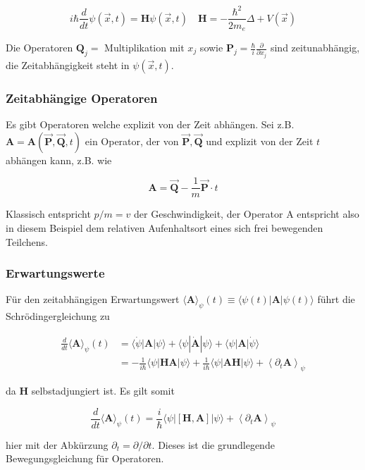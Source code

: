 \documentclass[10pt, letterpaper]{article}
\begin{document}
$$
i \hbar \frac{d}{d t} \psi(\vec{x}, t)=\mathbf{H} \psi(\vec{x}, t) \quad \mathbf{H}=-\frac{\hbar^{2}}{2 m_{e}} \Delta+V(\vec{x})
$$

Die Operatoren $\mathbf{Q}_{j}=$ Multiplikation mit $x_{j}$ sowie $\mathbf{P}_{j}=\frac{\hbar}{i} \frac{\partial}{\partial x_{j}}$ sind zeitunabhängig, die Zeitabhängigkeit steht in $\psi(\vec{x}, t)$.

\subsubsection*{Zeitabhängige Operatoren}
Es gibt Operatoren welche explizit von der Zeit abhängen. Sei z.B. $\mathbf{A}=\mathbf{A}(\overrightarrow{\mathbf{P}}, \overrightarrow{\mathbf{Q}}, t)$ ein Operator, der von $\overrightarrow{\mathbf{P}}, \overrightarrow{\mathbf{Q}}$ und explizit von der Zeit $t$ abhängen kann, z.B. wie

$$
\mathbf{A}=\overrightarrow{\mathbf{Q}}-\frac{1}{m} \overrightarrow{\mathbf{P}} \cdot t
$$

Klassisch entspricht $p / m=v$ der Geschwindigkeit, der Operator A entspricht also in diesem Beispiel dem relativen Aufenhaltsort eines sich frei bewegenden Teilchens.

\subsubsection*{Erwartungswerte}
Für den zeitabhängigen Erwartungswert $\langle\mathbf{A}\rangle_{\psi}(t) \equiv\langle\psi(t)| \mathbf{A}|\psi(t)\rangle$ führt die Schrödingergleichung zu

$$
\begin{aligned}
\frac{d}{d t}\langle\mathbf{A}\rangle_{\psi}(t) & =\langle\dot{\psi}| \mathbf{A}|\psi\rangle+\langle\psi| \dot{\mathbf{A}}|\psi\rangle+\langle\psi| \mathbf{A}|\dot{\psi}\rangle \\
& =-\frac{1}{i \hbar}\langle\psi| \mathbf{H A}|\psi\rangle+\frac{1}{i \hbar}\langle\psi| \mathbf{A H}|\psi\rangle+\left\langle\partial_{t} \mathbf{A}\right\rangle_{\psi}
\end{aligned}
$$

da $\mathbf{H}$ selbstadjungiert ist. Es gilt somit

$$
\frac{d}{d t}\langle\mathbf{A}\rangle_{\psi}(t)=\frac{i}{\hbar}\langle\psi|[\mathbf{H}, \mathbf{A}]|\psi\rangle+\left\langle\partial_{t} \mathbf{A}\right\rangle_{\psi}
$$

hier mit der Abkürzung $\partial_{t}=\partial / \partial t$. Dieses ist die grundlegende Bewegungsgleichung für Operatoren.
\end{document}
